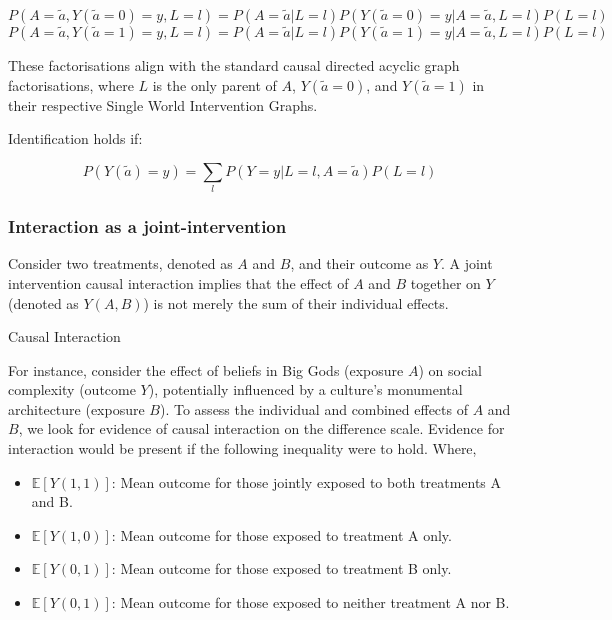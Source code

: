 \documentclass[
  single column]{article}
\providecommand{\tightlist}{%
  \setlength{\itemsep}{0pt}\setlength{\parskip}{0pt}}\usepackage{longtable,booktabs,array}
\begin{document}
\[
P(A = \tilde{a}, Y(\tilde{a}=0) = y, L = l) = P(A = \tilde{a}|L = l)P(Y(\tilde{a}=0) = y|A = \tilde{a}, L = l)P(L = l)
\] \[
P(A = \tilde{a}, Y(\tilde{a}=1) = y, L = l) = P(A = \tilde{a}|L = l)P(Y(\tilde{a}=1) = y|A = \tilde{a}, L = l)P(L = l)
\]

These factorisations align with the standard causal directed acyclic
graph factorisations, where \(L\) is the only parent of \(A\),
\(Y(\tilde{a}=0)\), and \(Y(\tilde{a}=1)\) in their respective Single
World Intervention Graphs.

Identification holds if:

\[
P(Y(\tilde{a}) = y) = \sum_l P(Y = y|L = l, A = \tilde{a}) P(L = l)
\]

\subsubsection{Interaction as a
joint-intervention}\label{interaction-as-a-joint-intervention}

Consider two treatments, denoted as \(A\) and \(B\), and their outcome
as \(Y\). A joint intervention causal interaction implies that the
effect of \(A\) and \(B\) together on \(Y\) (denoted as \(Y(A,B)\)) is
not merely the sum of their individual effects.

\begin{table}

\caption{\label{tbl-interactionpuzzle}Causal Interaction}

\centering{

\interactionpuzzle

}

\end{table}%

For instance, consider the effect of beliefs in Big Gods (exposure
\(A\)) on social complexity (outcome \(Y\)), potentially influenced by a
culture's monumental architecture (exposure \(B\)). To assess the
individual and combined effects of \(A\) and \(B\), we look for evidence
of causal interaction on the difference scale. Evidence for interaction
would be present if the following inequality were to hold. Where,

\begin{itemize}
\tightlist
\item
  \(\mathbb{E}[Y(1,1)]\): Mean outcome for those jointly exposed to both
  treatments A and B.
\item
  \(\mathbb{E}[Y(1,0)]\): Mean outcome for those exposed to treatment A
  only.
\item
  \(\mathbb{E}[Y(0,1)]\): Mean outcome for those exposed to treatment B
  only.
\item
  \(\mathbb{E}[Y(0,1)]\): Mean outcome for those exposed to neither
  treatment A nor B.
\end{itemize}
\end{document}
